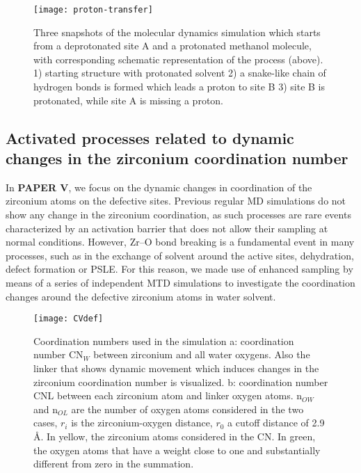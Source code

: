 \begin{figure}[!htbp]
	\centering
	\texttt{[image: proton-transfer]}
	\caption{Three snapshots of the molecular dynamics simulation which starts from a deprotonated site A and a protonated methanol molecule, with corresponding schematic representation of the process (above). 1) starting structure with protonated solvent 2) a snake-like chain of hydrogen bonds is formed which leads a proton to site B 3) site B is protonated, while site A is missing a proton.}
	\label{fig:proton-transfer}
\end{figure}

\subsection*{Activated processes related to dynamic changes in the zirconium coordination number}
In \textbf{PAPER V}, we focus on the dynamic changes in coordination of the zirconium atoms on the defective sites. Previous regular MD simulations do not show any change in the zirconium coordination, as such processes are rare events characterized by an activation barrier that does not allow their sampling at normal conditions. However, Zr--O bond breaking is a fundamental event in many processes, such as in the exchange of solvent around the active sites, dehydration, defect formation or PSLE. For this reason, we made use of enhanced sampling by means of a series of independent MTD simulations to investigate the coordination changes around the defective zirconium atoms in water solvent. 
\npar
\begin{figure}[!htbp]
	\centering
	\texttt{[image: CVdef]}
	\caption{Coordination numbers used in the simulation a: coordination number CN$_W$ between zirconium and all water oxygens. Also the linker that shows dynamic movement which induces changes in the zirconium coordination number is visualized. b: coordination number CNL between each zirconium atom  and linker oxygen atoms. n$_{OW}$ and n$_{OL}$ are the number of oxygen atoms considered in the two cases, $r_i$ is the zirconium-oxygen distance, $r_0$ a cutoff distance of 2.9 \AA. In yellow, the zirconium atoms considered in the CN. In green, the oxygen atoms that have a weight close to one and substantially different from zero in the summation.}
	\label{fig:CVdef}
\end{figure}
